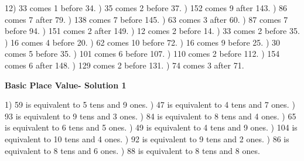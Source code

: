 \documentclass{article}%
\begin{document}
12) 33 comes 1 before 34.%
) 35 comes 2 before 37.%
) 152 comes 9 after 143.%
) 86 comes 7 after 79.%
) 138 comes 7 before 145.%
) 63 comes 3 after 60.%
) 87 comes 7 before 94.%
) 151 comes 2 after 149.%
) 12 comes 2 before 14.%
) 33 comes 2 before 35.%
) 16 comes 4 before 20.%
) 62 comes 10 before 72.%
) 16 comes 9 before 25.%
) 30 comes 5 before 35.%
) 101 comes 6 before 107.%
) 110 comes 2 before 112.%
) 154 comes 6 after 148.%
) 129 comes 2 before 131.%
) 74 comes 3 after 71.%
\newline%
\newpage%
\large%
\begin{center}%
\textbf{Basic Place Value- Solution 1}%
\newline%
\end{center} \normalsize%
1) 59 is equivalent to  5 tens and 9 ones.%
) 47 is equivalent to  4 tens and 7 ones.%
) 93 is equivalent to  9 tens and 3 ones.%
) 84 is equivalent to  8 tens and 4 ones.%
) 65 is equivalent to  6 tens and 5 ones.%
) 49 is equivalent to  4 tens and 9 ones.%
) 104 is equivalent to  10 tens and 4 ones.%
) 92 is equivalent to  9 tens and 2 ones.%
) 86 is equivalent to  8 tens and 6 ones.%
) 88 is equivalent to  8 tens and 8 ones.%
\newline%
\end{document}
